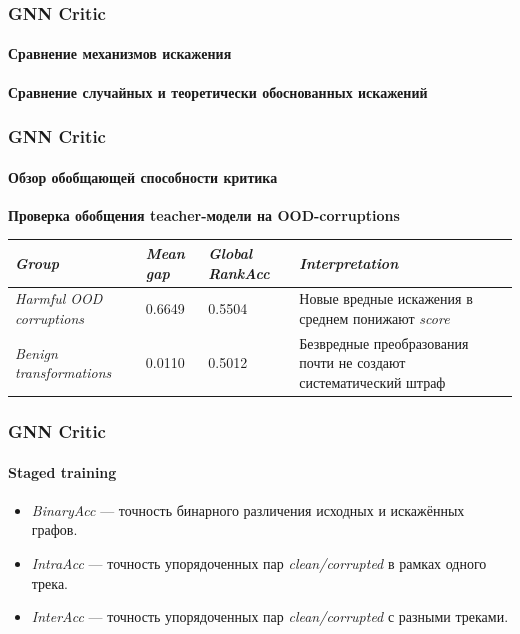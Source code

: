 \documentclass[aspectratio=169]{beamer}
\newcommand{\MetricLegend}{%
\vfill
{\fontsize{6.8}{8}\selectfont
	\begin{itemize}
		\setlength{\itemsep}{0.01cm}
		\item \textit{BinaryAcc} --- точность бинарного различения исходных и искажённых графов.
		\item \textit{IntraAcc} --- точность упорядоченных пар \textit{clean/corrupted} в рамках одного трека.
		\item \textit{InterAcc} --- точность упорядоченных пар \textit{clean/corrupted} с разными треками.
	\end{itemize}
}
}
\begin{document}
\begin{frame}
\frametitle{GNN Critic}
\framesubtitle{Сравнение механизмов искажения}
\begin{table}
\centering
\footnotesize
{\large\textbf{Сравнение случайных и теоретически обоснованных искажений}}\\[0.2cm]
\label{tab:1}
\end{table}
\end{frame}

\begin{frame}
\frametitle{GNN Critic}
\framesubtitle{Обзор обобщающей способности критика}
\begin{table}[htbp]
{\Large\textbf{Проверка обобщения teacher-модели на OOD-corruptions}}\\[0.25cm]
\label{tab:ood-corruption-groups}
\centering
\small
\setlength{\tabcolsep}{4pt}
\renewcommand{\arraystretch}{1.25}
\begin{tabular}{@{}p{3.5cm}p{1.7cm}p{1cm}p{6.2cm}@{}}
\toprule
\textit{Group} & \textit{Mean gap} & \textit{Global RankAcc} & \textit{Interpretation} \\
\midrule
\textit{Harmful OOD corruptions} & 0.6649 & 0.5504 & Новые вредные искажения в среднем понижают \textit{score} \\
\textit{Benign transformations} & 0.0110 & 0.5012 & Безвредные преобразования почти не создают систематический штраф \\
\bottomrule
\end{tabular}
\end{table}
\end{frame}

\begin{frame}
\frametitle{GNN Critic}
\framesubtitle{Staged training}
\begin{table}[htbp]
\caption{\textit{Staged training}}
\label{tab:3}
\centering
\scriptsize
{}
\end{table}
\MetricLegend
\end{frame}
\end{document}
